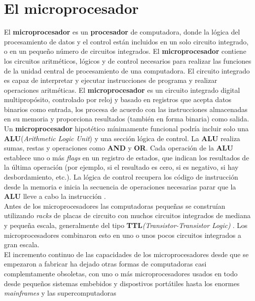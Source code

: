 \chapter{El microprocesador}\label{chapter:microprocesador}

El \textbf{microprocesador} es un \textbf{procesador} de computadora, donde la lógica del procesamiento de datos y el control
están incluidos en un solo circuito integrado, o en un pequeño número de circuitos integrados. El \textbf{microprocesador}
contiene los circuitos aritméticos, lógicos y de control necesarios para realizar las funciones de la unidad central de
procesamiento  de una computadora. El circuito integrado es capaz de interpretar y ejecutar instrucciones de programa y
realizar operaciones aritméticas. El \textbf{microprocesador} es un circuito integrado digital multipropósito, controlado
por reloj y basado en registros que acepta datos binarios como entrada, los procesa de acuerdo con las instrucciones
almacenadas en su memoria y proporciona resultados (también en forma binaria) como salida. Un \textbf{microprocesador}
hipotético mínimamente funcional podría incluir solo una \textbf{ALU}(\emph{Arithmetic Logic Unit}) y una sección lógica
de control. La \textbf{ALU} realiza sumas, restas y operaciones como \textbf{AND} y \textbf{OR}. Cada operación de la
\textbf{ALU} establece uno o más \emph{flags} en un registro de estados, que indican los resultados de la última operación
(por ejemplo, si el resultado es cero, si es negativo, si hay desbordamiento, etc.). La lógica de control recupera los
código de instrucción desde la memoria e inicia la secuencia de operaciones necesarias parar que la \textbf{ALU} lleve a
cabo la instrucción .\\ Antes de los microprocesadores las computadoras pequeñas
se construían utilizando  \emph{racks} de placas de circuito con muchos circuitos integrados de mediana y pequeña escala,
generalmente del tipo \textbf{TTL}\emph{(Transistor-Transistor Logic)} . Los microprocesadores
combinaron esto en uno o unos pocos circuitos integrados a gran escala.\\ El incremento continuo de las capacidades de los
microprocesadores desde  que se empezaron a fabricar ha dejado otras formas de computadoras casi complemtamente obsoletas,
con uno o más microprocesadores usados en todo desde pequeños sistemas embebidos y dispostivos portátiles hasta los enormes
\emph{mainframes} y las supercomputadoras

